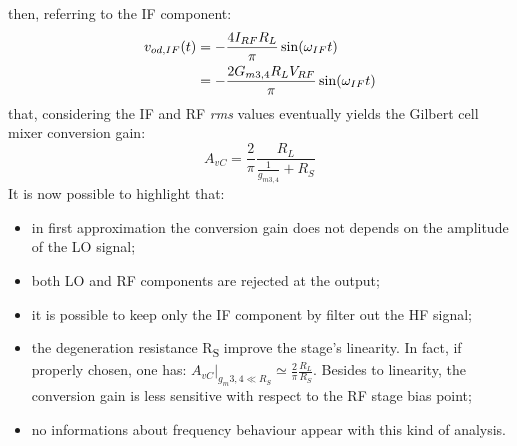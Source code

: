 then, referring to the IF component:
\begin{align}
v_{od,IF}(t)& = -\frac{4I_{RF}R_L}{\pi}\sin(\omega_{IF} t) \notag \\
& = -\frac{2G_{m3,4}R_LV_{RF}}{\pi}\sin(\omega_{IF} t) 
\end{align}
that, considering the IF and RF \emph{rms} values eventually yields the Gilbert cell mixer conversion gain:
\begin{equation}
\label{eq:ConvGain}
A_{vC} = \frac{2}{\pi}\frac{R_L}{\frac{1}{g_{m3,4}}+R_S}
\end{equation}
It is now possible to highlight that:
\begin{itemize}
	\item in first approximation the conversion gain does not depends on the amplitude of the LO signal;
	\item both LO and RF components are rejected at the output;
	\item it is possible to keep only the IF component by filter out the HF signal;
	\item the degeneration resistance R\textsubscript{S} improve the stage's linearity. In fact, if properly chosen, one has: $A_{vC}|_{g_m3,4 \ll R_S}\simeq\frac{2}{\pi}\frac{R_L}{R_S}$. Besides to linearity, the conversion gain is less sensitive with respect to the RF stage bias point;
	\item no informations about frequency behaviour appear with this kind of analysis.
\end{itemize}  



